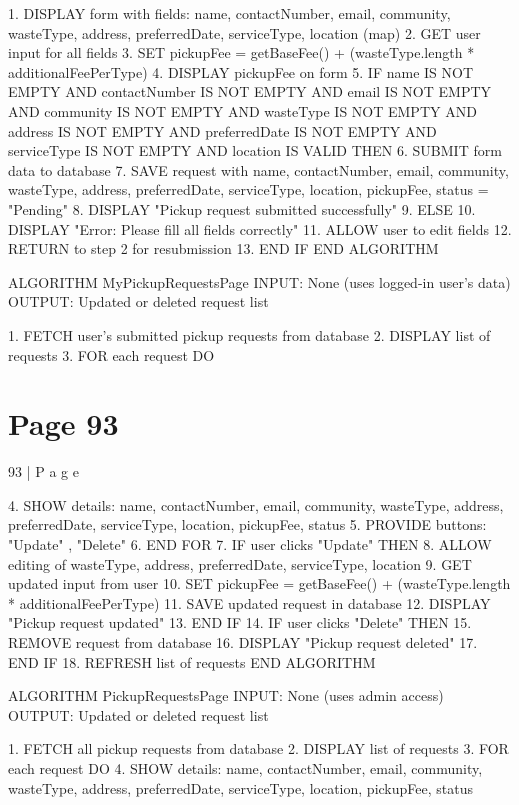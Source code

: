 \documentclass{article}
\begin{document}
1. DISPLAY form with fields: name, contactNumber, email, community, wasteType, 
address, preferredDate, serviceType, location (map) 
2. GET user input for all fields 
3. SET pickupFee = getBaseFee() + (wasteType.length * additionalFeePerType) 
4. DISPLAY pickupFee on form 
5. IF name IS NOT EMPTY AND contactNumber IS NOT EMPTY AND email IS NOT EMPTY 
AND community IS NOT EMPTY AND wasteType IS NOT EMPTY AND address IS NOT EMPTY 
AND preferredDate IS NOT EMPTY AND serviceType IS NOT EMPTY AND location IS VALID 
THEN 
    6. SUBMIT form data to database 
    7. SAVE request with name, contactNumber, email, community, wasteType, address, 
preferredDate, serviceType, location, pickupFee, status = "Pending" 
    8. DISPLAY "Pickup request submitted successfully" 
9. ELSE 
    10. DISPLAY "Error: Please fill all fields correctly" 
    11. ALLOW user to edit fields 
    12. RETURN to step 2 for resubmission 
13. END IF 
END ALGORITHM 
 
ALGORITHM MyPickupRequestsPage 
INPUT: None (uses logged-in user’s data) 
OUTPUT: Updated or deleted request list 
  
1. FETCH user’s submitted pickup requests from database 
2. DISPLAY list of requests 
3. FOR each request DO 

\section*{Page 93}
93 | P a g e 
 
    4. SHOW details: name, contactNumber, email, community, wasteType, address, 
preferredDate, serviceType, location, pickupFee, status 
    5. PROVIDE buttons: "Update" , "Delete" 
6. END FOR 
7. IF user clicks "Update" THEN 
    8. ALLOW editing of wasteType, address, preferredDate, serviceType, location 
    9. GET updated input from user 
    10. SET pickupFee = getBaseFee() + (wasteType.length * additionalFeePerType) 
    11. SAVE updated request in database 
    12. DISPLAY "Pickup request updated" 
13. END IF 
14. IF user clicks "Delete" THEN 
    15. REMOVE request from database 
    16. DISPLAY "Pickup request deleted" 
17. END IF 
18. REFRESH list of requests 
END ALGORITHM 
 
ALGORITHM PickupRequestsPage 
INPUT: None (uses admin access) 
OUTPUT: Updated or deleted request list 
  
1. FETCH all pickup requests from database 
2. DISPLAY list of requests 
3. FOR each request DO 
    4. SHOW details: name, contactNumber, email, community, wasteType, address, 
preferredDate, serviceType, location, pickupFee, status 
\end{document}
